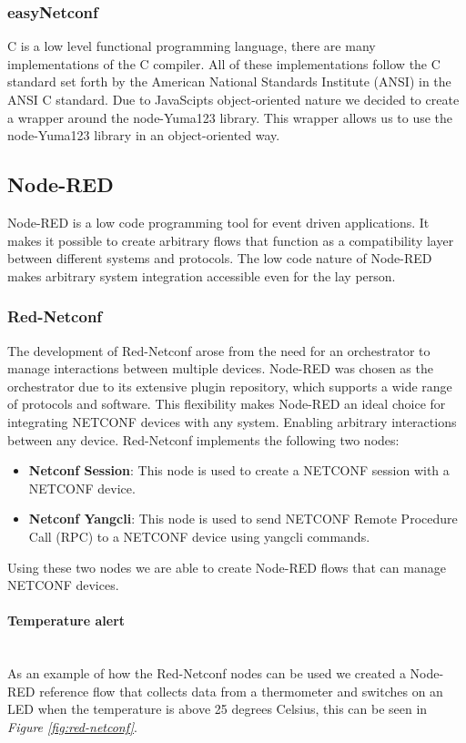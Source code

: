 \documentclass[12pt]{article}
\newcommand{\subsubsubsection}[1]{\paragraph{#1}\mbox{}\\}
\begin{document}
\subsubsection{easyNetconf}
C is a low level functional programming language, there are many implementations of the C compiler.
All of these implementations follow the C standard set forth by the American National Standards Institute 
(ANSI) in the ANSI C standard. Due to JavaScipts object-oriented nature we decided to create 
a wrapper around the node-Yuma123 library. This wrapper allows us to use the node-Yuma123
library in an object-oriented way.

\subsection{Node-RED}
Node-RED is a low code programming tool for event driven applications.
It makes it possible to create arbitrary flows that function as a compatibility layer
between different systems and protocols. The low code nature of Node-RED makes arbitrary system
integration accessible even for the lay person.

\subsubsection{Red-Netconf}
The development of Red-Netconf \cite{LightsideinstrumentsRednetconf} arose from the need for an orchestrator to manage interactions between multiple devices. 
Node-RED was chosen as the orchestrator due to its extensive plugin repository, which supports a wide range of protocols and software. 
This flexibility makes Node-RED an ideal choice for integrating NETCONF devices with any system.
Enabling arbitrary interactions between any device.
Red-Netconf \cite{LightsideinstrumentsRednetconf} implements the following two 
nodes:
\begin{itemize}
  \item \textbf{Netconf Session}: This node is used to create a NETCONF session with a NETCONF device.
  \item \textbf{Netconf Yangcli}: This node is used to send NETCONF Remote Procedure Call (RPC) to a NETCONF device using yangcli commands.
\end{itemize}
Using these two nodes we are able to create Node-RED flows that can manage NETCONF devices.

\subsubsubsection{Temperature alert}
As an example of how the Red-Netconf nodes can be used we created
a Node-RED reference flow that collects data from a thermometer and switches on an LED
when the temperature is above 25 degrees Celsius, this can be seen in \textit{Figure \ref{fig:red-netconf}}.
\end{document}

